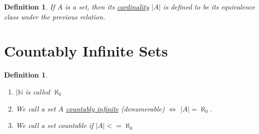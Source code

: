 \documentclass{article}
\newtheorem{definition}[theorem]{Definition}
\begin{document}
\begin{definition}
    If $A$ is a set, then its \underline{cardinality} $|A|$ is defined to be its equivalence class under the previous relation. 
\end{definition}

\section*{Countably Infinite Sets}

\begin{definition}
    \begin{enumerate}
    \item $|\mathbb{N}$ is called $\aleph_0$
    \item We call a set $A$ \underline{countably infinite} (denumerable) $\iff$ $|A| = \aleph_0$.
    \item We call a set countable if $|A| <= \aleph_0$
    \end{enumerate}
\end{definition}
\end{document}
